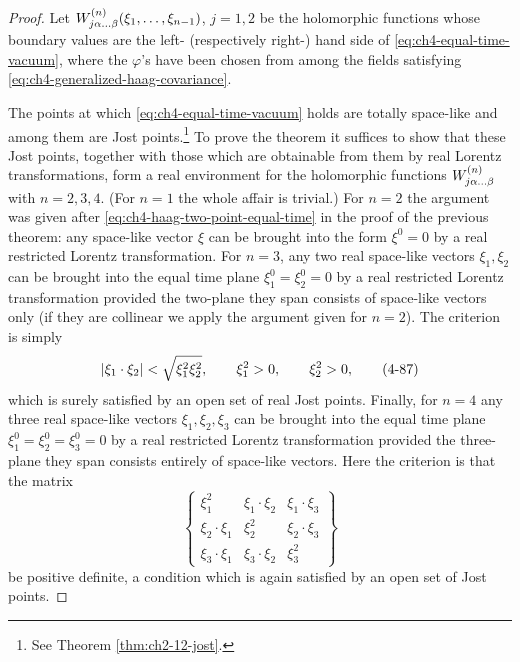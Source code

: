 \begin{proof}
Let $W^{(n)}_{j\alpha\ldots\beta}
(\xi_1,\ldots,\xi_{n-1})$, $j=1,2$ be the holomorphic functions whose boundary
values are the left- (respectively right-) hand side of \eqref{eq:ch4-equal-time-vacuum}, where the
$\varphi$'s have been chosen from among the fields satisfying \eqref{eq:ch4-generalized-haag-covariance}.

The points at which \eqref{eq:ch4-equal-time-vacuum} holds are totally space-like and among them are
Jost points.\footnote{%
See Theorem \ref{thm:ch2-12-jost}.}%
To prove the theorem it suffices to show that these Jost points, together with
those which are obtainable from them by real Lorentz transformations, form a
real environment for the holomorphic functions
$W^{(n)}_{j\alpha\ldots\beta}$ with $n=2,3,4$.  (For $n=1$ the
whole affair is trivial.)  For $n=2$ the argument was given after \eqref{eq:ch4-haag-two-point-equal-time} in
the proof of the previous theorem: any space-like vector $\xi$ can be brought
into the form $\xi^0=0$ by a real restricted Lorentz transformation.  For
$n=3$, any two real space-like vectors $\xi_1,\xi_2$ can be brought into the
equal time plane $\xi_1^0=\xi_2^0=0$ by a real restricted Lorentz
transformation provided the two-plane they span consists of space-like
vectors only (if they are collinear we apply the argument given for $n=2$).
The criterion is simply
\begin{equation}
  \lvert\xi_1\mathbin{\cdot}\xi_2\rvert
  <\sqrt{\xi_1^2\xi_2^2},\qquad
  \xi_1^2>0,\qquad \xi_2^2>0,
  \tag{4-87}\label{eq:ch4-jost-criterion-two}
\end{equation}
which is surely satisfied by an open set of real Jost points.  Finally, for
$n=4$ any three real space-like vectors $\xi_1,\xi_2,\xi_3$ can be brought
into the equal time plane $\xi_1^0=\xi_2^0=\xi_3^0=0$ by a real restricted
Lorentz transformation provided the three-plane they span consists entirely
of space-like vectors.  Here the criterion is that the matrix
\begin{equation}
  \left\{
  \begin{matrix}
    \xi_1^2 & \xi_1\mathbin{\cdot}\xi_2 & \xi_1\mathbin{\cdot}\xi_3\\
    \xi_2\mathbin{\cdot}\xi_1 & \xi_2^2 & \xi_2\mathbin{\cdot}\xi_3\\
    \xi_3\mathbin{\cdot}\xi_1 & \xi_3\mathbin{\cdot}\xi_2 & \xi_3^2
  \end{matrix}
  \right\}
  \tag{4-88}\label{eq:ch4-jost-criterion-three}
\end{equation}
be positive definite, a condition which is again satisfied by an open set of
Jost points.
\end{proof}


